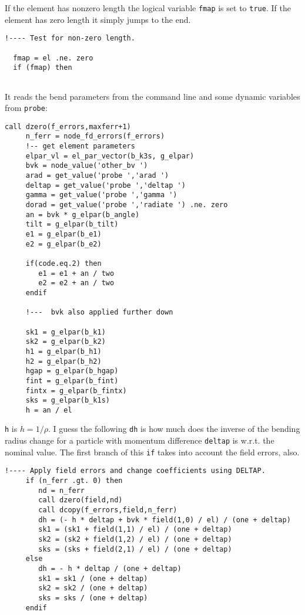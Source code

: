 \documentclass{cern-art} %
\begin{document}
If the element has nonzero length the logical variable \lstinline[firstnumber=last]{fmap} is set to \lstinline[firstnumber=last]{true}.
If the element has zero length it simply jumps to the end.

\begin{lstlisting}[firstnumber=last]
  !---- Test for non-zero length.

  fmap = el .ne. zero
  if (fmap) then
  
  \end{lstlisting}
It reads the bend parameters from the command line and some dynamic variables from \lstinline[firstnumber=last]{probe}:
  \begin{lstlisting}[firstnumber=last]
     call dzero(f_errors,maxferr+1)
     n_ferr = node_fd_errors(f_errors)
     !-- get element parameters
     elpar_vl = el_par_vector(b_k3s, g_elpar)
     bvk = node_value('other_bv ')
     arad = get_value('probe ','arad ')
     deltap = get_value('probe ','deltap ')
     gamma = get_value('probe ','gamma ')
     dorad = get_value('probe ','radiate ') .ne. zero
     an = bvk * g_elpar(b_angle)
     tilt = g_elpar(b_tilt)
     e1 = g_elpar(b_e1)
     e2 = g_elpar(b_e2)

     if(code.eq.2) then
        e1 = e1 + an / two
        e2 = e2 + an / two
     endif

     !---  bvk also applied further down

     sk1 = g_elpar(b_k1)
     sk2 = g_elpar(b_k2)
     h1 = g_elpar(b_h1)
     h2 = g_elpar(b_h2)
     hgap = g_elpar(b_hgap)
     fint = g_elpar(b_fint)
     fintx = g_elpar(b_fintx)
     sks = g_elpar(b_k1s)
     h = an / el
  \end{lstlisting}
\lstinline[firstnumber=last]{h} is $h=1/\rho$. I guess the following \lstinline[firstnumber=last]{dh} is how much does the inverse of the bending radius change for a particle with momentum difference \lstinline[firstnumber=last]{deltap} is w.r.t. the nominal value. The first branch of this \lstinline[firstnumber=last]{if} takes into account the field errors, also.
  \begin{lstlisting}[firstnumber=last]
     !---- Apply field errors and change coefficients using DELTAP.
     if (n_ferr .gt. 0) then
        nd = n_ferr
        call dzero(field,nd)
        call dcopy(f_errors,field,n_ferr)
        dh = (- h * deltap + bvk * field(1,0) / el) / (one + deltap)
        sk1 = (sk1 + field(1,1) / el) / (one + deltap)
        sk2 = (sk2 + field(1,2) / el) / (one + deltap)
        sks = (sks + field(2,1) / el) / (one + deltap)
     else
        dh = - h * deltap / (one + deltap)
        sk1 = sk1 / (one + deltap)
        sk2 = sk2 / (one + deltap)
        sks = sks / (one + deltap)
     endif
  \end{lstlisting}
\end{document}
